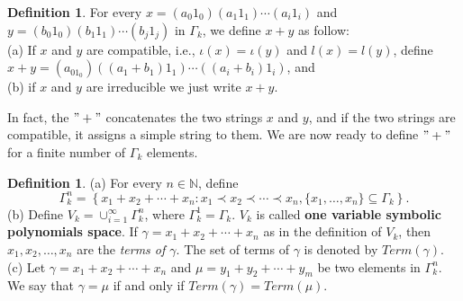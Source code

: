 \documentclass{amsart}
\theoremstyle{definition}
\newtheorem{definition}[theorem]{Definition}
\theoremstyle{remark}
\numberwithin{equation}{section}
\begin{document}
\begin{definition}{\label{3.22}}
	For every $x = (a_0 1_0)(a_1 1_1) \cdots (a_i 1_i)$ and $ y = (b_0 1_0)(b_1 1_1) \cdots (b_j 1_j)$ in $\Gamma_k$, we define $x+y$ as follow:\\
	(a) If $x$ and $y$ are compatible, i.e., $\iota(x)=\iota(y)$ and $l(x)=l(y)$, define $x+y=(a_01_0)((a_1+b_1) 1_1) \cdots ((a_i+b_i) 1_i)$, and  \\
	(b) if $x$ and $y$ are irreducible we just write $x+y$. 
\end{definition}
In fact, the $"+"$ concatenates the two strings $x$ and $y$, and if the two strings are compatible, it assigns a simple string to them. We are now ready to define $"+"$ for a finite number of $\Gamma_k$ elements.
\begin{definition}{\label{3.55}}
	(a)	For every $n\in\mathbb{N}$, define 
	\[
	\Gamma_k^n=\left\{ x_1 + x_2 + \cdots + x_n : x_{1}\prec x_{2}\prec\cdots\prec x_{n}, \{x_1,\ldots,x_n\}\subseteq\Gamma_k\right\}.
	\]
	(b) Define $V_k =\cup_{i=1}^\infty \Gamma_k^n$, where $\Gamma_k^1=\Gamma_k$. $V_k$ is called \textbf{one variable symbolic polynomials space}. If \( \gamma = x_1 + x_2 + \cdots + x_n \) as in the definition of \( V_k \), then \( x_1, x_2, \ldots, x_n \) are the \textit{terms of \( \gamma \)}. The set of terms of $\gamma$ is denoted by $Term(\gamma)$.\\
	(c) Let \( \gamma = x_1 + x_2 + \cdots + x_n \) and \( \mu = y_1 + y_2 + \cdots + y_m \) be two elements in \( \Gamma^n_k \). We say that \( \gamma = \mu \) if and only if $Term(\gamma)=Term(\mu)$. 
\end{definition}
\end{document}
